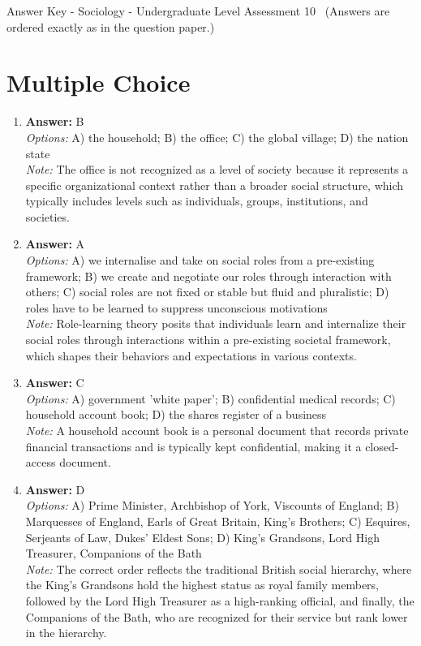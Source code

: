 \documentclass[12pt]{article}
\begin{document}
\begin{center}
Answer Key - Sociology - Undergraduate Level Assessment 10 \
\small (Answers are ordered exactly as in the question paper.)
\end{center}

\section*{Multiple Choice}
\begin{enumerate}[label=\arabic*.]
\item \textbf{Answer:} B
\\ \textit{Options:} A) the household; B) the office; C) the global village; D) the nation state
\\ \textit{Note:} The office is not recognized as a level of society because it represents a specific organizational context rather than a broader social structure, which typically includes levels such as individuals, groups, institutions, and societies.
\item \textbf{Answer:} A
\\ \textit{Options:} A) we internalise and take on social roles from a pre-existing framework; B) we create and negotiate our roles through interaction with others; C) social roles are not fixed or stable but fluid and pluralistic; D) roles have to be learned to suppress unconscious motivations
\\ \textit{Note:} Role-learning theory posits that individuals learn and internalize their social roles through interactions within a pre-existing societal framework, which shapes their behaviors and expectations in various contexts.
\item \textbf{Answer:} C
\\ \textit{Options:} A) government 'white paper'; B) confidential medical records; C) household account book; D) the shares register of a business
\\ \textit{Note:} A household account book is a personal document that records private financial transactions and is typically kept confidential, making it a closed-access document.
\item \textbf{Answer:} D
\\ \textit{Options:} A) Prime Minister, Archbishop of York, Viscounts of England; B) Marquesses of England, Earls of Great Britain, King's Brothers; C) Esquires, Serjeants of Law, Dukes' Eldest Sons; D) King's Grandsons, Lord High Treasurer, Companions of the Bath
\\ \textit{Note:} The correct order reflects the traditional British social hierarchy, where the King's Grandsons hold the highest status as royal family members, followed by the Lord High Treasurer as a high-ranking official, and finally, the Companions of the Bath, who are recognized for their service but rank lower in the hierarchy.

\end{enumerate}
\end{document}
